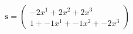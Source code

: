 \documentclass[preview]{standalone}
\begin{document}
\begin{align*}
\mathbf{s} = \begin{pmatrix}-2x^{1} + 2x^{2} + 2x^{3} \\ 1 + -1x^{1} + -1x^{2} + -2x^{3}\end{pmatrix}
\end{align*}
\end{document}
